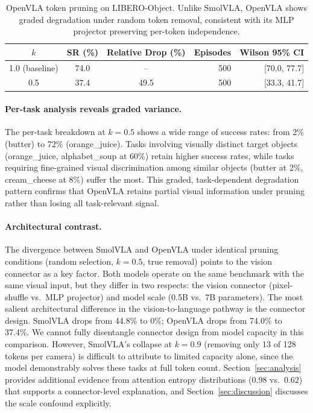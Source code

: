 \begin{table}[t]
\centering
\small
\caption{OpenVLA token pruning on LIBERO-Object. Unlike SmolVLA, OpenVLA shows graded degradation under random token removal, consistent with its MLP projector preserving per-token independence.}
\label{tab:openvla_degradation}
\begin{tabular}{cccrr}
\toprule
$k$ & SR (\%) & Relative Drop (\%) & Episodes & Wilson 95\% CI \\
\midrule
1.0 (baseline) & 74.0 & -- & 500 & [70.0, 77.7] \\
0.5 & 37.4 & 49.5 & 500 & [33.3, 41.7] \\
\bottomrule
\end{tabular}
\end{table}

\paragraph{Per-task analysis reveals graded variance.}
The per-task breakdown at $k{=}0.5$ shows a wide range of success rates: from 2\% (butter) to 72\% (orange\_juice). Tasks involving visually distinct target objects (orange\_juice, alphabet\_soup at 60\%) retain higher success rates, while tasks requiring fine-grained visual discrimination among similar objects (butter at 2\%, cream\_cheese at 8\%) suffer the most. This graded, task-dependent degradation pattern confirms that OpenVLA retains partial visual information under pruning rather than losing all task-relevant signal.

\paragraph{Architectural contrast.}
The divergence between SmolVLA and OpenVLA under identical pruning conditions (random selection, $k{=}0.5$, true removal) points to the vision connector as a key factor. Both models operate on the same benchmark with the same visual input, but they differ in two respects: the vision connector (pixel-shuffle vs.\ MLP projector) and model scale (0.5B vs.\ 7B parameters). The most salient architectural difference in the vision-to-language pathway is the connector design. SmolVLA drops from 44.8\% to 0\%; OpenVLA drops from 74.0\% to 37.4\%. We cannot fully disentangle connector design from model capacity in this comparison. However, SmolVLA's collapse at $k{=}0.9$ (removing only 13 of 128 tokens per camera) is difficult to attribute to limited capacity alone, since the model demonstrably solves these tasks at full token count. Section~\ref{sec:analysis} provides additional evidence from attention entropy distributions (0.98 vs.\ 0.62) that supports a connector-level explanation, and Section~\ref{sec:discussion} discusses the scale confound explicitly.
